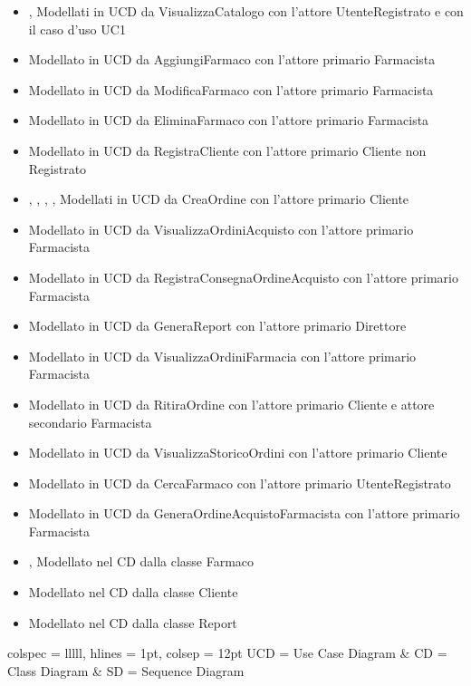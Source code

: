 \begin{itemize}
	\item {},  Modellati in UCD da VisualizzaCatalogo con l'attore UtenteRegistrato e con il caso d'uso UC1
	\item {} Modellato in UCD da AggiungiFarmaco con l'attore primario Farmacista
	\item {} Modellato in UCD da ModificaFarmaco con l'attore primario Farmacista
	\item {} Modellato in UCD da EliminaFarmaco con l'attore primario Farmacista
	\item {} Modellato in UCD da RegistraCliente con l'attore primario Cliente non Registrato
	\item {}, , , ,  Modellati in UCD da CreaOrdine con l'attore primario Cliente
	\item {} Modellato in UCD da VisualizzaOrdiniAcquisto con l'attore primario Farmacista
	\item {} Modellato in UCD da RegistraConsegnaOrdineAcquisto con l'attore primario Farmacista
	\item {} Modellato in UCD da GeneraReport con l'attore primario Direttore
	\item {} Modellato in UCD da VisualizzaOrdiniFarmacia con l'attore primario Farmacista
	\item {} Modellato in UCD da RitiraOrdine con l'attore primario Cliente e attore secondario Farmacista
	\item {} Modellato in UCD da VisualizzaStoricoOrdini con l'attore primario Cliente
	\item {} Modellato in UCD da CercaFarmaco con l'attore primario UtenteRegistrato
	\item {} Modellato in UCD da GeneraOrdineAcquistoFarmacista con l'attore primario Farmacista
	\item {},  Modellato nel CD dalla classe Farmaco
	\item {} Modellato nel CD dalla classe Cliente
	\item {} Modellato nel CD dalla classe Report
\end{itemize}

\begin{table}[!hbp]
	\centering
	\begin{tblr}{
		colspec = lllll,
		hlines = {1pt}, colsep = 12pt
		}
		UCD = Use Case Diagram &
		CD = Class Diagram &
		SD = Sequence Diagram \\
	\end{tblr}
\end{table}